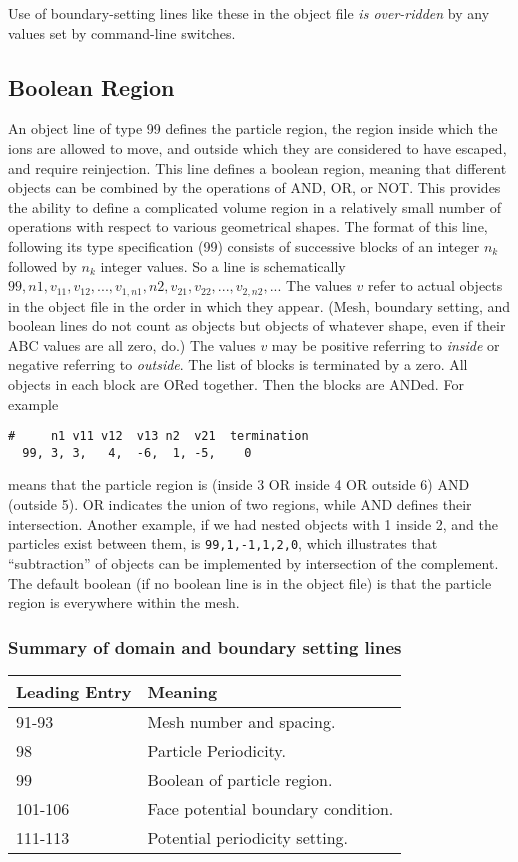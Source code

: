 \documentclass[12pt]{article}
\begin{document}
Use of boundary-setting lines like these in the object file
\emph{is over-ridden} by any values set by command-line switches.

\subsection{Boolean Region}

An object line of type 99 defines the particle region, the region
inside which the ions are allowed to move, and outside which they are
considered to have escaped, and require reinjection. This line defines
a boolean region, meaning that different objects can be combined by
the operations of AND, OR, or NOT. This provides the ability to define
a complicated volume region in a relatively small number of operations
with respect to various geometrical shapes. The format of this line,
following its type specification (99) consists of successive blocks of
an integer $n_k$ followed by $n_k$ integer values. So a line is
schematically
$99,n1,v_{11},v_{12},...,v_{1,n1},n2,v_{21},v_{22},...,v_{2,n2},...$
The values $v$ refer to actual objects in the object file in the order
in which they appear. (Mesh, boundary setting, and boolean lines do
not count as objects but objects of whatever shape, even if their ABC
values are all zero, do.)  The values $v$ may be positive referring to
\emph{inside} or negative referring to \emph{outside}. The list of
blocks is terminated by a zero. All objects in each block are ORed
together. Then the blocks are ANDed. For example
\begin{verbatim}
#     n1 v11 v12  v13 n2  v21  termination
  99, 3, 3,   4,  -6,  1, -5,    0
\end{verbatim}
means that the particle region is (inside 3 OR inside 4 OR outside 6)
AND (outside 5). OR indicates the union of two regions, while AND defines
their intersection. Another example, if we had nested objects with 1
inside 2, and the particles exist between them, is
\verb!99,1,-1,1,2,0!, which illustrates that ``subtraction'' of
objects can be implemented by intersection of the complement.  The
default boolean (if no boolean line is in the object file) is that the
particle region is everywhere within the mesh.

\subsubsection*{Summary of domain and boundary setting lines}

\par
\begin{tabular}{|l|l|}
\hline
Leading Entry & Meaning\\
\hline
91-93    & Mesh number and spacing.\\
98       & Particle Periodicity.\\
99       & Boolean of particle region.\\
101-106  & Face potential boundary condition.\\
111-113  & Potential periodicity setting.\\
\hline
\end{tabular}
\end{document}
